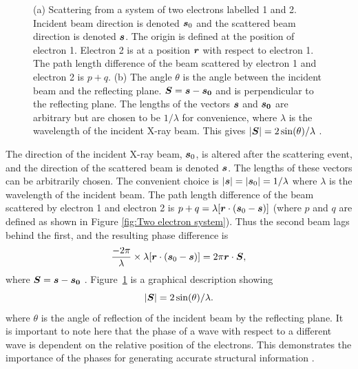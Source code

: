 \begin{figure}
\begin{subfigure}[b]{0.45\textwidth}
                        \caption{}
                        \label{fig:scattering vector}
                \end{subfigure}
                \caption[X-ray scattering from two electrons.]{(a) Scattering from a system of two electrons labelled 1 and 2. Incident beam direction is denoted $\boldsymbol{s}_0$ and the scattered beam direction is denoted $\boldsymbol{s}$.
                The origin is defined at the position of electron 1. Electron 2 is at a position $\boldsymbol{r}$ with respect to electron 1.
                The path length difference of the beam scattered by electron 1 and electron 2 is $p + q$.
                (b) The angle $\theta$ is the angle between the incident beam and the reflecting plane.
                $\boldsymbol{S} = \boldsymbol{s} - \boldsymbol{s_0}$ and is perpendicular to the reflecting plane.
                The lengths of the vectors $\boldsymbol{s}$ and $\boldsymbol{s_0}$ are arbitrary but are chosen to be $1/\lambda$ for convenience, where $\lambda$ is the wavelength of the incident X-ray beam.
                This gives $|\boldsymbol{S}| = 2 \sin(\theta)/\lambda$ \cite{drenth1999}.}
        		\label{fig:Scattering from two electrons}
            \end{figure}
            The direction of the incident X-ray beam, $\boldsymbol{s}_0$, is altered after the scattering event, and the direction of the scattered beam is denoted $\boldsymbol{s}$.
            The lengths of these vectors can be arbitrarily chosen.
            The convenient choice is $|\boldsymbol{s}| = |\boldsymbol{s}_0| = 1/\lambda$ where $\lambda$ is the wavelength of the incident beam.
            The path length difference of the beam scattered by electron 1 and electron 2 is $p + q = \lambda[\boldsymbol{r} \cdot (\boldsymbol{s}_0 - \boldsymbol{s})]$ (where $p$ and $q$ are defined as shown in Figure \ref{fig:Two electron system}).
            Thus the second beam lags behind the first, and the resulting phase difference is
            \begin{equation}
                \frac{-2 \pi}{\lambda} \times \lambda[\boldsymbol{r} \cdot (\boldsymbol{s}_0 - \boldsymbol{s})] = 2 \pi \boldsymbol{r} \cdot \boldsymbol{S},
            \end{equation}
            where $\boldsymbol{S} = \boldsymbol{s} - \boldsymbol{s_0}$ \cite{drenth1999}. Figure~\ref{fig:scattering vector} is a graphical description showing
            \begin{equation}
                |\boldsymbol{S}| = 2 \sin(\theta)/\lambda.
                \label{eq:length of vector S}
            \end{equation}
            where $\theta$ is the angle of reflection of the incident beam by the reflecting plane.
            It is important to note here that the phase of a wave with respect to a different wave is dependent on the relative position of the electrons.
            This demonstrates the importance of the phases for generating accurate structural information \cite{taylor2003phase, taylor2010}.

